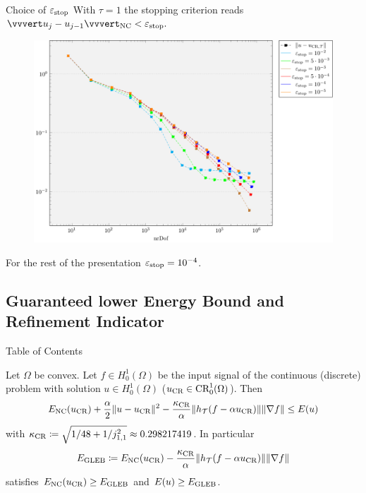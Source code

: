 \begin{frame}{Choice of $\varepsilon_\textup{stop}$}
  With $\tau=1$ the stopping criterion reads $\vvvert u_j-u_{j-1}\vvvert_\nc<
  \varepsilon_\textup{stop}.$
  \begin{figure}[!ht]
    \centering
    \includegraphics[width=0.8\linewidth]
      {pictures/experiments/choiceOfParameters/epsStop/convergence.pdf}
  \end{figure}

  \pause
  For the rest of the presentation $\varepsilon_\textup{stop} = 10^{-4}$.
\end{frame}


\subsection{Guaranteed lower Energy Bound and Refinement Indicator}
\begin{frame}[noframenumbering]{Table of Contents}
\end{frame}

\begin{frame}
  \begin{theorem}
    Let $\Omega$ be convex. Let $f\in H^1_0(\Omega)$ be the input signal of the
    continuous (discrete) problem with solution $u\in H^1_0(\Omega)$ ($u_\textup{CR}\in
    \textup{CR}^1_0(\Omega)$).
    Then
    \begin{align*}
      E_\textup{NC}(u_\textup{CR})+\frac{\alpha}{2}\Vert u-u_\textup{CR}\Vert^2
      -\frac{\kappa_{\textup{CR}}}{\alpha}\Vert
      h_{\mathcal{T}}(f-\alpha u_\textup{CR})\Vert \Vert\nabla f\Vert\leq E(u)
    \end{align*}
    with $\kappa_{\textup{CR}}\coloneqq\sqrt{1/48+1/j_{1,1}^2} \approx 0.298217419$.
    \pause
    In particular 
    \begin{align*}
      E_\textup{GLEB} 
      \coloneqq 
      E_\textup{NC}(u_\textup{CR}) - \frac{\kappa_{\textup{CR}}}{\alpha}\Vert h_{\mathcal{T}}(f-\alpha u_\textup{CR})\Vert
      \Vert \nabla f\Vert
    \end{align*}
      satisfies $E_\textup{NC}(u_\textup{CR})\geq E_\textup{GLEB}$ and $E(u)\geq E_\textup{GLEB}$.
  \end{theorem}
\end{frame}


